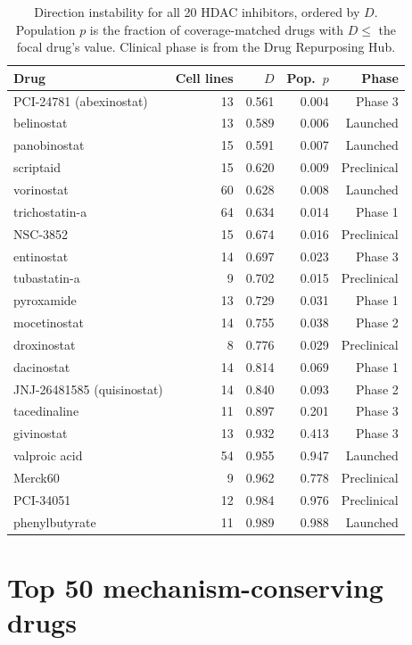 \documentclass[11pt]{article}
\begin{document}
\begin{table}[h]
\centering
\caption{Direction instability for all 20 HDAC inhibitors, ordered by $D$.
Population $p$ is the fraction of coverage-matched drugs with $D \leq$ the
focal drug's value. Clinical phase is from the Drug Repurposing Hub.}
\label{tab:hdac_full}
\small
\begin{tabular}{lrrrr}
\toprule
Drug & Cell lines & $D$ & Pop.\ $p$ & Phase \\
\midrule
PCI-24781 (abexinostat) & 13 & 0.561 & 0.004 & Phase 3 \\
belinostat & 13 & 0.589 & 0.006 & Launched \\
panobinostat & 15 & 0.591 & 0.007 & Launched \\
scriptaid & 15 & 0.620 & 0.009 & Preclinical \\
vorinostat & 60 & 0.628 & 0.008 & Launched \\
trichostatin-a & 64 & 0.634 & 0.014 & Phase 1 \\
NSC-3852 & 15 & 0.674 & 0.016 & Preclinical \\
entinostat & 14 & 0.697 & 0.023 & Phase 3 \\
tubastatin-a & 9 & 0.702 & 0.015 & Preclinical \\
pyroxamide & 13 & 0.729 & 0.031 & Phase 1 \\
mocetinostat & 14 & 0.755 & 0.038 & Phase 2 \\
droxinostat & 8 & 0.776 & 0.029 & Preclinical \\
dacinostat & 14 & 0.814 & 0.069 & Phase 1 \\
JNJ-26481585 (quisinostat) & 14 & 0.840 & 0.093 & Phase 2 \\
tacedinaline & 11 & 0.897 & 0.201 & Phase 3 \\
givinostat & 13 & 0.932 & 0.413 & Phase 3 \\
valproic acid & 54 & 0.955 & 0.947 & Launched \\
Merck60 & 9 & 0.962 & 0.778 & Preclinical \\
PCI-34051 & 12 & 0.984 & 0.976 & Preclinical \\
phenylbutyrate & 11 & 0.989 & 0.988 & Launched \\
\bottomrule
\end{tabular}
\end{table}

\section{Top 50 mechanism-conserving drugs}
\label{app:top50}
\end{document}
